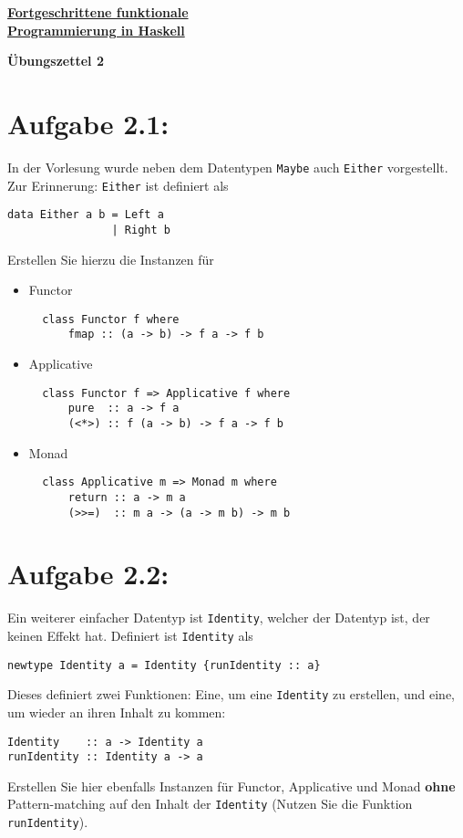 \documentclass[a4paper,10pt]{scrartcl}
\newcommand{\underfat}[1]{\underline{\textbf{#1}}}
\newcommand{\theuebungszettel}{2}
\begin{document}
\begin{center}
  \begin{huge}
    \underfat{Fortgeschrittene funktionale}\\
    \underfat{Programmierung in Haskell}\\
  \end{huge}
\begin{LARGE}
\textbf{Übungszettel \theuebungszettel}
\end{LARGE}
\end{center}
\section*{Aufgabe \theuebungszettel.1:}
In der Vorlesung wurde neben dem Datentypen \texttt{Maybe} auch \texttt{Either} vorgestellt. Zur Erinnerung: \texttt{Either} ist definiert als
\begin{verbatim}
data Either a b = Left a
                | Right b
\end{verbatim}
Erstellen Sie hierzu die Instanzen für
\begin{itemize}
 \item Functor
       \begin{verbatim}
  class Functor f where
      fmap :: (a -> b) -> f a -> f b
       \end{verbatim}
 \item Applicative
       \begin{verbatim}
  class Functor f => Applicative f where
      pure  :: a -> f a
      (<*>) :: f (a -> b) -> f a -> f b
       \end{verbatim}
 \item Monad
       \begin{verbatim}
  class Applicative m => Monad m where
      return :: a -> m a
      (>>=)  :: m a -> (a -> m b) -> m b
       \end{verbatim}
\end{itemize}
\section*{Aufgabe \theuebungszettel.2:}
Ein weiterer einfacher Datentyp ist \texttt{Identity}, welcher der Datentyp ist, der keinen Effekt hat. Definiert ist \texttt{Identity} als
\begin{verbatim}
newtype Identity a = Identity {runIdentity :: a}
\end{verbatim}
Dieses definiert zwei Funktionen: Eine, um eine \texttt{Identity} zu erstellen, und eine, um wieder an ihren Inhalt zu kommen:
\begin{verbatim}
Identity    :: a -> Identity a
runIdentity :: Identity a -> a
\end{verbatim}
Erstellen Sie hier ebenfalls Instanzen für Functor, Applicative und Monad \textbf{ohne} Pattern-matching auf den Inhalt der \texttt{Identity} (Nutzen Sie die Funktion \texttt{runIdentity}).
\end{document}
